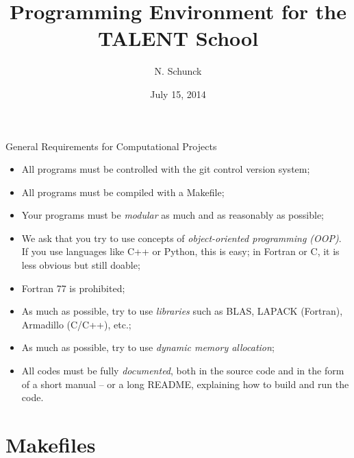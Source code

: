 \documentclass[mode=present,paper=screen,size=12pt,style=paintings]{powerdot}
\title{Programming Environment for the TALENT School}
\author{N. Schunck}
\date{July 15, 2014}
\begin{document}
\maketitle



\begin{slide}{General Requirements for Computational Projects}

\begin{itemize}
\item All programs must be controlled with the git control version system;
\item All programs must be compiled with a Makefile;
\item Your programs must be {\em modular} as much and as reasonably as possible;
\item We ask that you try to use concepts of {\em object-oriented programming (OOP)}. If you use languages like C++ or Python, this is easy; in Fortran or C, it is less obvious but still doable;
\item Fortran 77 is prohibited;
\item As much as possible, try to use {\em libraries} such as BLAS, LAPACK (Fortran), Armadillo (C/C++), etc.;
\item As much as possible, try to use {\em dynamic memory allocation};
\item All codes must be fully {\em documented}, both in the source code and in the form of a short manual -- or a long README, explaining how to build and run the code.
\end{itemize}

\end{slide}



\section{Makefiles}
\end{document}
